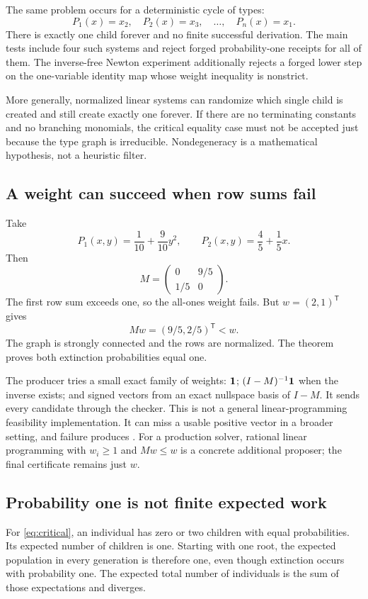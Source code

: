 The same problem occurs for a deterministic cycle of types:
\[
 P_1(x)=x_2,\quad P_2(x)=x_3,\quad\ldots,\quad P_n(x)=x_1.
\]
There is exactly one child forever and no finite successful derivation. The main tests include four such systems and reject forged probability-one receipts for all of them. The inverse-free Newton experiment additionally rejects a forged lower step on the one-variable identity map whose weight inequality is nonstrict.

More generally, normalized linear systems can randomize which single child is created and still create exactly one forever. If there are no terminating constants and no branching monomials, the critical equality case must not be accepted just because the type graph is irreducible. Nondegeneracy is a mathematical hypothesis, not a heuristic filter.

\subsection{A weight can succeed when row sums fail}
Take
\[
 P_1(x,y)=\frac1{10}+\frac9{10}y^2,
 \qquad
 P_2(x,y)=\frac45+\frac15x.
\]
Then
\[
 M=\begin{pmatrix}0&9/5\\1/5&0\end{pmatrix}.
\]
The first row sum exceeds one, so the all-ones weight fails. But $w=(2,1)^{\mathsf T}$ gives
\[
 Mw=(9/5,2/5)^{\mathsf T}<w.
\]
The graph is strongly connected and the rows are normalized. The theorem proves both extinction probabilities equal one.

The producer tries a small exact family of weights: $\mathbf 1$; $(I-M)^{-1}\mathbf 1$ when the inverse exists; and signed vectors from an exact nullspace basis of $I-M$. It sends every candidate through the checker. This is not a general linear-programming feasibility implementation. It can miss a usable positive vector in a broader setting, and failure produces . For a production solver, rational linear programming with $w_i\ge1$ and $Mw\le w$ is a concrete additional proposer; the final certificate remains just $w$.

\subsection{Probability one is not finite expected work}
For \eqref{eq:critical}, an individual has zero or two children with equal probabilities. Its expected number of children is one. Starting with one root, the expected population in every generation is therefore one, even though extinction occurs with probability one. The expected total number of individuals is the sum of those expectations and diverges.

